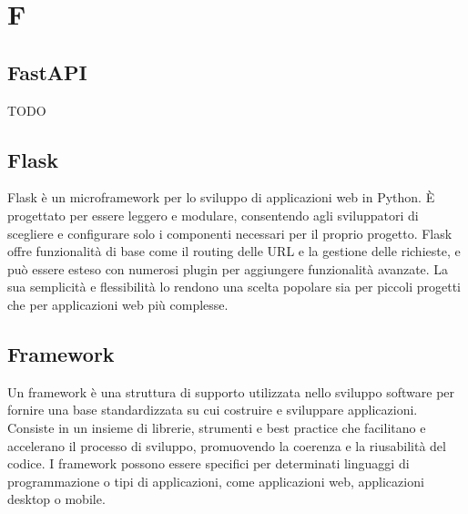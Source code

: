 \section{F}
\vspace{2em}
\subsection*{FastAPI}
TODO

\vspace{2em}
\subsection*{Flask}
Flask è un microframework per lo sviluppo di applicazioni web in Python. È progettato per essere leggero e modulare, consentendo agli sviluppatori di scegliere e configurare solo i componenti necessari per il proprio progetto. Flask offre funzionalità di base come il routing delle URL e la gestione delle richieste, e può essere esteso con numerosi plugin per aggiungere funzionalità avanzate. La sua semplicità e flessibilità lo rendono una scelta popolare sia per piccoli progetti che per applicazioni web più complesse.


\vspace{2em}
\subsection*{Framework}
Un framework è una struttura di supporto utilizzata nello sviluppo software per fornire una base standardizzata su cui costruire e sviluppare applicazioni. Consiste in un insieme di librerie, strumenti e best practice che facilitano e accelerano il processo di sviluppo, promuovendo la coerenza e la riusabilità del codice. I framework possono essere specifici per determinati linguaggi di programmazione o tipi di applicazioni, come applicazioni web, applicazioni desktop o mobile.
